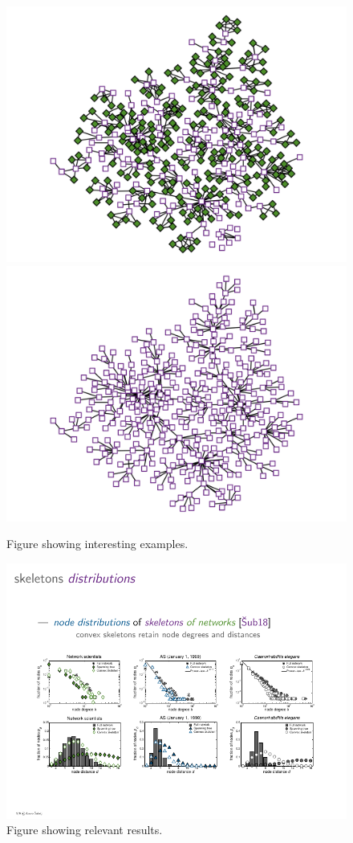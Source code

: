 \documentclass[9pt,twocolumn,twoside]{pnas-report}
\begin{document}
\lipsum[2-3]

\begin{figure}[t]\centering%
	\includegraphics[width=0.49\linewidth]{example1}
	\includegraphics[width=0.49\linewidth]{example2}
	\caption{Figure showing interesting examples.~\cite{Sub18a}}
\end{figure}

\lipsum[4-6]

\begin{figure}[b]\centering%
	\includegraphics[width=\linewidth]{distributions}
	\caption{Figure showing relevant results.~\cite{Sub18a}}
\end{figure}
\end{document}
